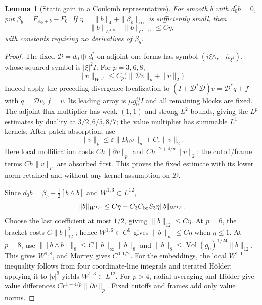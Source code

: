 \documentclass[11pt]{article}
\numberwithin{equation}{section}
\newtheorem{lemma}[theorem]{Lemma}
\theoremstyle{definition}
\theoremstyle{remark}
\begin{document}
\begin{lemma}[Static gain in a Coulomb representative]
\label{lem:static-coulomb-gain}
For smooth \(b\) with \(d_0^*b=0\), put
\(\beta_b=F_{A_0+b}-F_0\).
If \(\eta=\|b\|_4+\|\beta_b\|_\infty\) is sufficiently small,
then
\[
       \|b\|_{W^{1,8}}+\|b\|_{C^{0,1/2}}\le C\eta ,
\]
with constants requiring no derivatives of \(\beta_b\).
\end{lemma}
\begin{proof}
The fixed \(\mathcal D=d_0\oplus d_0^*\) on adjoint one-forms
has symbol \((i\xi\wedge,-i\iota_{\xi^\sharp})\), whose
squared symbol is \(|\xi|^2I\). For \(p=3,6,8\),
\[
 \|v\|_{W^{1,p}}\le C_p\bigl(\|\mathcal Dv\|_p+\|v\|_2\bigr).
\]
Indeed apply the preceding divergence localization to
\((I+\mathcal D^*\mathcal D)v=\mathcal D^*q+f\)
with \(q=\mathcal Dv\), \(f=v\). Its leading array is
\(\mu g_0^{ij}I\) and all remaining blocks are fixed.
The adjoint flux multiplier has weak \((1,1)\) and strong \(L^2\)
bounds, giving the \(L^p\) estimates by duality at \(3/2,6/5,8/7\);
the value multiplier has summable \(L^1\) kernels.
After patch absorption, use
\[
 \|v\|_p\le\varepsilon\|D_0v\|_p+C_\varepsilon\|v\|_2 .
\]
Here local mollification costs \(Ch\|\partial v\|_p\)
and \(Ch^{-2+4/p}\|v\|_2\); the cutoff/frame terms
\(Ch\|v\|_p\) are absorbed first. This proves the fixed
estimate with its lower norm retained and without
any kernel assumption on \(\mathcal D\).

Since \(d_0b=\beta_b-\tfrac12[b\wedge b]\) and
\(W^{1,3}\subset L^{12}\),
\[
 \|b\|_{W^{1,3}}\le C\eta+
 C_3C_{\rm br}S_3\eta\|b\|_{W^{1,3}} .
\]
Choose the last coefficient at most \(1/2\), giving
\(\|b\|_{12}\le C\eta\).
At \(p=6\), the bracket costs \(C\|b\|_{12}^2\);
hence \(W^{1,6}\subset C^0\) gives
\(\|b\|_\infty\le C\eta\) when \(\eta\le1\).
At \(p=8\), use
\(\|[b\wedge b]\|_8\le C\|b\|_\infty\|b\|_8\) and
\(\|b\|_8\le\operatorname{Vol}(g_0)^{1/24}\|b\|_{12}\).
This gives \(W^{1,8}\), and Morrey gives \(C^{0,1/2}\).
For the embeddings, the local \(W^{1,1}\) inequality
follows from four coordinate-line integrals and iterated
H\"older; applying it to \(|v|^9\) yields \(W^{1,3}\subset L^{12}\).
For \(p>4\), radial averaging and H\"older give value
differences \(Cr^{1-4/p}\|\partial v\|_p\).
Fixed cutoffs and frames add only value norms.
\end{proof}
\end{document}
